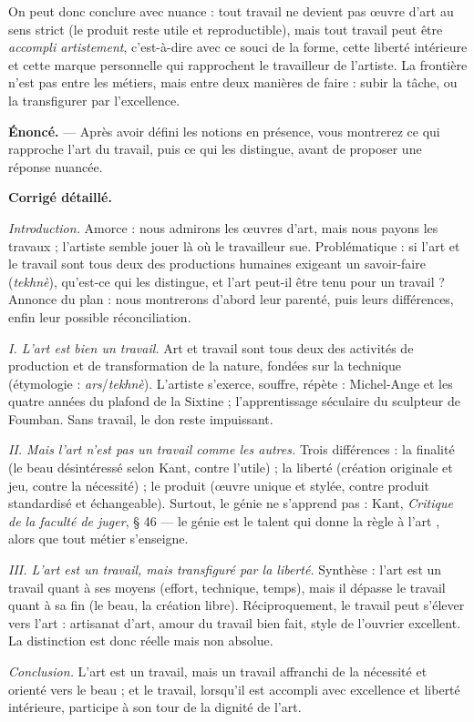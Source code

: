 \documentclass[11pt]{article}
\begin{document}
On peut donc conclure avec nuance : tout travail ne devient pas œuvre d'art au sens strict (le produit reste utile et reproductible), mais tout travail peut être \emph{accompli artistement}, c'est-à-dire avec ce souci de la forme, cette liberté intérieure et cette marque personnelle qui rapprochent le travailleur de l'artiste. La frontière n'est pas entre les métiers, mais entre deux manières de faire : subir la tâche, ou la transfigurer par l'excellence.

\begin{exoresolu}
\textbf{Énoncé.} — Après avoir défini les notions en présence, vous montrerez ce qui rapproche l'art du travail, puis ce qui les distingue, avant de proposer une réponse nuancée.

\tcblower
\textbf{Corrigé détaillé.}

\emph{Introduction.} Amorce : nous admirons les œuvres d'art, mais nous payons les travaux ; l'artiste semble jouer là où le travailleur sue. Problématique : si l'art et le travail sont tous deux des productions humaines exigeant un savoir-faire (\emph{tekhnè}), qu'est-ce qui les distingue, et l'art peut-il être tenu pour un travail ? Annonce du plan : nous montrerons d'abord leur parenté, puis leurs différences, enfin leur possible réconciliation.

\emph{I. L'art est bien un travail.} Art et travail sont tous deux des activités de production et de transformation de la nature, fondées sur la technique (étymologie : \emph{ars}/\emph{tekhnè}). L'artiste s'exerce, souffre, répète : Michel-Ange et les quatre années du plafond de la Sixtine ; l'apprentissage séculaire du sculpteur de Foumban. Sans travail, le don reste impuissant.

\emph{II. Mais l'art n'est pas un travail comme les autres.} Trois différences : la finalité (le beau désintéressé selon Kant, contre l'utile) ; la liberté (création originale et jeu, contre la nécessité) ; le produit (œuvre unique et stylée, contre produit standardisé et échangeable). Surtout, le génie ne s'apprend pas : Kant, \emph{Critique de la faculté de juger}, § 46 — le génie est \guillemotleft le talent qui donne la règle à l'art \guillemotright, alors que tout métier s'enseigne.

\emph{III. L'art est un travail, mais transfiguré par la liberté.} Synthèse : l'art est un travail quant à ses moyens (effort, technique, temps), mais il dépasse le travail quant à sa fin (le beau, la création libre). Réciproquement, le travail peut s'élever vers l'art : artisanat d'art, amour du travail bien fait, style de l'ouvrier excellent. La distinction est donc réelle mais non absolue.

\emph{Conclusion.} L'art est un travail, mais un travail affranchi de la nécessité et orienté vers le beau ; et le travail, lorsqu'il est accompli avec excellence et liberté intérieure, participe à son tour de la dignité de l'art.
\end{exoresolu}
\end{document}
